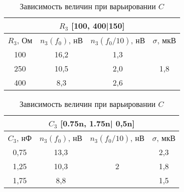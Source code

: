 \begin{enumerate}
	 \newpage
	\begin{table}[!h]
		\centering
		\begin{tabular}{|cccc|}
			\hline
			\multicolumn{4}{|c|}{$ R_3 $ {[}100, 400|150{]}}                                                                                         \\ \hline
			\multicolumn{1}{|c|}{$ R_3 $, Ом} & \multicolumn{1}{c|}{$ n_3(f_0) $, нВ} & \multicolumn{1}{c|}{$ n_3 (f_0/10) $, нВ} & $ \sigma $, мкВ           \\ \hline
			\multicolumn{1}{|c|}{100}      & \multicolumn{1}{c|}{16,2}           & \multicolumn{1}{c|}{1,3}               & \multirow{3}{*}{1,8} \\ \cline{1-3}
			\multicolumn{1}{|c|}{250}      & \multicolumn{1}{c|}{10,5}           & \multicolumn{1}{c|}{2,0}               &                      \\ \cline{1-3}
			\multicolumn{1}{|c|}{400}      & \multicolumn{1}{c|}{8,3}            & \multicolumn{1}{c|}{2,6}               &                      \\ \hline
		\end{tabular}
		\caption{Зависимость величин при варьировании $ R $}
		\label{tab:tabel_11}
		
		\begin{tabular}{|cccc|}
			\hline
			\multicolumn{4}{|c|}{$ C_3 $ {[}0.75n, 1.75n| 0,5n{]}}                                                                          \\ \hline
			\multicolumn{1}{|c|}{$ C_3 $, нФ} & \multicolumn{1}{c|}{$ n_3 (f_0) $, нВ} & \multicolumn{1}{c|}{$ n_3(f_0/10) $, нВ}  & $ \sigma $, мкВ \\ \hline
			\multicolumn{1}{|c|}{0,75}     & \multicolumn{1}{c|}{13,3}           & \multicolumn{1}{c|}{\multirow{3}{*}{2}} & 2,3        \\ \cline{1-2} \cline{4-4} 
			\multicolumn{1}{|c|}{1,25}     & \multicolumn{1}{c|}{10,3}           & \multicolumn{1}{c|}{}                   & 1,8        \\ \cline{1-2} \cline{4-4} 
			\multicolumn{1}{|c|}{1,75}     & \multicolumn{1}{c|}{8,8}            & \multicolumn{1}{c|}{}                   & 1,5        \\ \hline
		\end{tabular}
		\caption{Зависимость величин при варьировании $ C $}
		\label{tab:tabel_12}


\end{table}
\end{enumerate}
